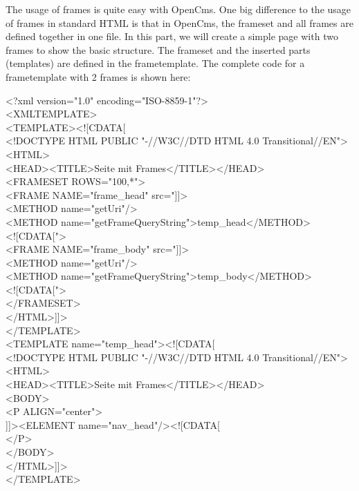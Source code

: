 The usage of frames is quite easy with OpenCms. One big difference
to the usage of frames in standard HTML is that in OpenCms,
the frameset and all frames are defined together in one file.  In this part, we will
create a simple page with two frames to show the basic structure.
The frameset and the inserted parts (templates) are defined in the
frametemplate. The complete code for a frametemplate with 2 frames
is shown here:
\begin{xml}
<?xml version="1.0" encoding="ISO-8859-1"?>\\
<XMLTEMPLATE>\\

<TEMPLATE><![CDATA[\\
<!DOCTYPE HTML PUBLIC "-//W3C//DTD HTML 4.0 Transitional//EN">\\
<HTML>\\
  <HEAD><TITLE>Seite mit Frames</TITLE></HEAD>\\
  <FRAMESET ROWS="100,*">\\
\xtaba     <FRAME NAME="frame\_head" src="]]>\\
\xtabb <METHOD name="getUri"/>\\
\xtabb            <METHOD name="getFrameQueryString">temp\_head</METHOD>\\
\xtabb            <![CDATA[">\\
\xtaba     <FRAME NAME="frame\_body" src="]]>\\
\xtabb            <METHOD name="getUri"/>\\
\xtabb            <METHOD name="getFrameQueryString">temp\_body</METHOD>\\
\xtabb            <![CDATA[">\\
  </FRAMESET>\\
</HTML>]]>\\
</TEMPLATE>\\
<TEMPLATE name="temp\_head"><![CDATA[\\
\xtaba <!DOCTYPE HTML PUBLIC "-//W3C//DTD HTML 4.0 Transitional//EN">\\
\xtaba <HTML>\\
\xtaba   <HEAD><TITLE>Seite mit Frames</TITLE></HEAD>\\
\xtaba   <BODY>\\
\xtabb             <P ALIGN="center">\\
\xtabb       ]]><ELEMENT name="nav\_head"/><![CDATA[\\
\xtabb     </P>\\
\xtaba   </BODY>\\
\xtaba </HTML>]]>\\
</TEMPLATE>\\


\end{xml}
